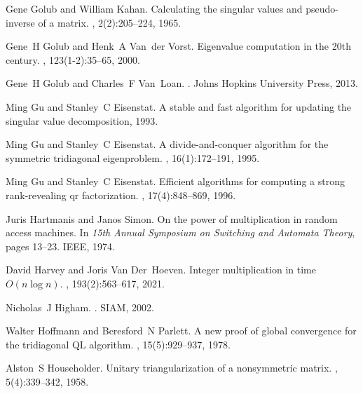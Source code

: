 \documentclass{article}
\begin{document}
\begin{thebibliography}{10}
Gene Golub and William Kahan.
\newblock Calculating the singular values and pseudo-inverse of a matrix.
, 2(2):205--224, 1965.

Gene~H Golub and Henk~A Van~der Vorst.
\newblock Eigenvalue computation in the 20th century.
, 123(1-2):35--65, 2000.

Gene~H Golub and Charles~F Van~Loan.
.
\newblock Johns Hopkins University Press, 2013.

Ming Gu and Stanley~C Eisenstat.
\newblock A stable and fast algorithm for updating the singular value decomposition, 1993.

Ming Gu and Stanley~C Eisenstat.
\newblock A divide-and-conquer algorithm for the symmetric tridiagonal eigenproblem.
, 16(1):172--191, 1995.

Ming Gu and Stanley~C Eisenstat.
\newblock Efficient algorithms for computing a strong rank-revealing qr factorization.
, 17(4):848--869, 1996.

Juris Hartmanis and Janos Simon.
\newblock On the power of multiplication in random access machines.
\newblock In {\em 15th Annual Symposium on Switching and Automata Theory}, pages 13--23. IEEE, 1974.

David Harvey and Joris Van Der~Hoeven.
\newblock Integer multiplication in time {$O(n\log n)$}.
, 193(2):563--617, 2021.

Nicholas~J Higham.
.
\newblock SIAM, 2002.

Walter Hoffmann and Beresford~N Parlett.
\newblock A new proof of global convergence for the tridiagonal {QL} algorithm.
, 15(5):929--937, 1978.

Alston~S Householder.
\newblock Unitary triangularization of a nonsymmetric matrix.
, 5(4):339--342, 1958.


\end{thebibliography}
\end{document}

